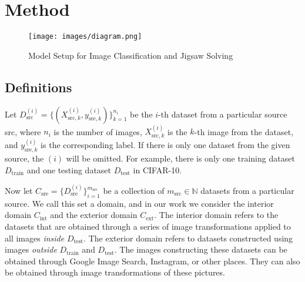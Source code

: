 \documentclass{article}
\begin{document}
\section{Method}
\begin{figure}[!t]
  \centering
  \texttt{[image: images/diagram.png]}
  \caption{Model Setup for Image Classification and Jigsaw Solving}\label{fig:method}
\end{figure}
\subsection{Definitions} 
Let $D_\text{src}^{(i)} = \{(X_{\text{src}, k}^{(i)}, y_{\text{sre}, k}^{(i)})\}_{k = 1}^{n_i}$ be the $i$-th dataset from a particular source src, where $n_i$ is the number of images, $X_{\text{src}, k}^{(i)}$ is the $k$-th image from the dataset, and $y_{\text{sre}, k}^{(i)}$ is the corresponding label. If there is only one dataset from the given source, the $(i)$ will be omitted. For example, there is only one training dataset $D_\text{train}$ and one testing dataset $D_\text{test}$ in CIFAR-10.

Now let $C_\text{sre} = \{D_{\text{sre}}^{(i)}\}^{m_\text{src}}_{i = 1}$ be a collection of $m_\text{src} \in \mathbb{N}$ datasets from a particular source. We call this set a domain, and in our work we consider the interior domain $C_\text{int}$ and the exterior domain $C_\text{ext}$. The interior domain refers to the datasets that are obtained through a series of image transformations applied to all images \textit{inside} $D_\text{test}$. The exterior domain refers to datasets constructed using images \textit{outside} $D_\text{train}$ and $D_\text{test}$. The images constructing these datasets can be obtained through Google Image Search, Instagram, or other places. They can also be obtained through image transformations of these pictures.
\end{document}
